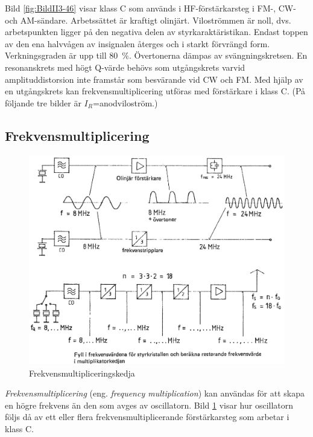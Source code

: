 Bild \ref{fig:BildII3-46} visar klass C som används i HF-förstärkarsteg i
FM-, CW- och AM-sändare.
Arbetssättet är kraftigt olinjärt.
Viloströmmen är noll, dvs. arbetspunkten ligger på den negativa delen av
styrkaraktäristikan.
Endast toppen av den ena halvvågen av insignalen återges och i starkt
förvrängd form.
Verkningsgraden är upp till 80~\%.
Övertonerna dämpas av svängningskretsen.
En resonanskrets med högt Q-värde behövs som utgångskrets varvid
amplituddistorsion inte framstår som besvärande vid CW och FM.
Med hjälp av en utgångskrets kan frekvensmultiplicering utföras med
förstärkare i klass C.
(På följande tre bilder är \(I_R\)=anodviloström.)

\subsection{Frekvensmultiplicering}

\begin{figure}
\includegraphics[width=\textwidth]{images/cropped_pdfs/bild_2_3-47.pdf}
\caption{Frekvensmultipliceringskedja}
\label{fig:BildII3-47}
\end{figure}

\emph{Frekvensmultiplicering} (eng. \emph{frequency multiplication}) kan
användas för att skapa en högre frekvens än den som avges av oscillatorn.
Bild \ref{fig:BildII3-47} visar hur oscillatorn följs då av ett eller flera
frekvensmultiplicerande förstärkarsteg som arbetar i klass C.

